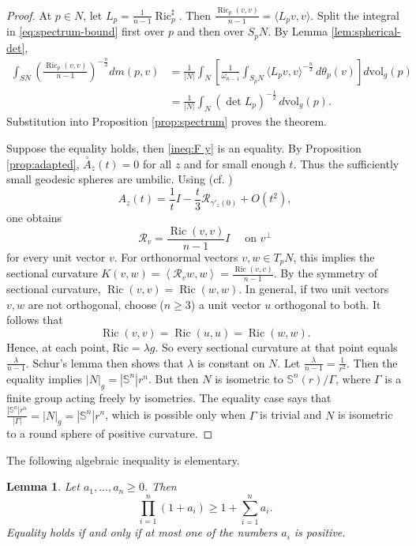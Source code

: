 \documentclass[11pt, reqno]{amsart}
\newtheorem{lemma}{Lemma}
\begin{document}
\begin{proof}
At $p\in N$, let $L_p=\frac{1}{n-1}\operatorname{Ric}_p^{\sharp}$.
Then
$\frac{\operatorname{Ric}_p(v, v)}{n-1}=\langle L_pv, v\rangle$. Split the integral
in \eqref{eq:spectrum-bound} first over $p$ and then over $S_pN$. By
Lemma \ref{lem:spherical-det},
\begin{align*}
\int_{SN} \left(\frac{\operatorname{Ric}_p(v, v)}{n-1}\right)^{-\frac{n}{2}}dm(p, v)
& =\frac{1}{\lvert N\rvert}
\int_N\left[\frac{1}{\omega_{n-1}}\int_{S_pN} \langle L_pv, v\rangle^{-\frac{n}{2}}\, d\theta_p(v) \right]d\mathrm{vol}_g(p)\\
& =\frac{1}{\lvert N\rvert} \int_N(\det L_p)^{-\frac{1}{2}}\, d\mathrm{vol}_g(p).
\end{align*}
Substitution into Proposition \ref{prop:spectrum} proves the theorem.

Suppose the equality holds, then \eqref{ineq:F y} is an equality. By Proposition \ref{prop:adapted}, $\stackrel{\circ}{A}_z(t)=0$ for all $z$ and for small enough $t$. Thus the sufficiently small geodesic spheres are umbilic. Using (cf. \cite[Theorem 3.1]{ChenVanhecke})
$$
A_z(t)=\frac{1}{t} I-\frac{t}{3} \mathcal {R}_{{\gamma}'_z(0)}+O\left(t^2\right),
$$
one obtains
$$
\mathcal {R}_v=\frac{\operatorname{Ric}(v, v)}{n-1} I \quad \text { on } v^{\perp}
$$
for every unit vector $v$. For orthonormal vectors $v, w \in T_p N$, this implies the sectional curvature
$K(v, w)=\left\langle \mathcal R_v w, w\right\rangle=\frac{\operatorname{Ric}(v, v)}{n-1}$.
By the symmetry of sectional curvature, $\operatorname{Ric}(v, v)=\operatorname{Ric}(w, w)$.
In general, if two unit vectors $v, w$ are not orthogonal, choose ($n \ge 3$) a unit vector $u$ orthogonal to both. It follows that
$$
\operatorname{Ric}(v, v)=\operatorname{Ric}(u, u)=\operatorname{Ric}(w, w).
$$
Hence, at each point, $\mathrm{Ric}=\lambda g$. So every sectional curvature at that point equals $\frac{\lambda}{n-1}$. Schur's lemma then shows that $\lambda$ is constant on $N$. Let $\frac{\lambda}{n-1}=\frac{1}{r^2}$. Then the equality implies $|N|_g=|\mathbb S^n|r^n$. But then $N$ is isometric to $\mathbb{S}^n(r) / \Gamma$, where $\Gamma$ is a finite group acting freely by isometries. The equality case says that $\frac{\left|\mathbb{S}^n\right|r^n}{|\Gamma|}=|N|_g=\left|\mathbb{S}^n\right|r^n$, which is possible only when $\Gamma$ is trivial and $N$ is isometric to a round sphere of positive curvature.
\end{proof}
The following algebraic inequality is elementary.
\begin{lemma}\label{lem:det-lower}
Let $a_1, \ldots, a_n\ge 0$. Then $$ \prod_{i=1}^n(1+a_i) \ge 1+\sum_{i=1}^n a_i. $$
Equality holds if and only if at most one of the numbers $a_i$ is positive.
\end{lemma}
\end{document}
